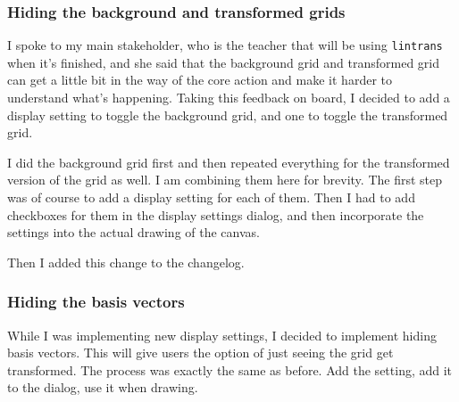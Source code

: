 \documentclass[../development.tex]{subfiles}
\begin{document}
\subsubsection{Hiding the background and transformed grids\label{development:making-v0.2.2:hiding-the-background-and-transformed-grids}}

I spoke to my main stakeholder, who is the teacher that will be using \texttt{lintrans} when it's finished, and she said that the background grid and transformed grid can get a little bit in the way of the core action and make it harder to understand what's happening. Taking this feedback on board, I decided to add a display setting to toggle the background grid, and one to toggle the transformed grid.

I did the background grid first and then repeated everything for the transformed version of the grid as well. I am combining them here for brevity. The first step was of course to add a display setting for each of them. Then I had to add checkboxes for them in the display settings dialog, and then incorporate the settings into the actual drawing of the canvas.





Then I added this change to the changelog.


\subsubsection{Hiding the basis vectors\label{development:making-v0.2.2:hiding-the-basis-vectors}}

While I was implementing new display settings, I decided to implement hiding basis vectors. This will give users the option of just seeing the grid get transformed. The process was exactly the same as before. Add the setting, add it to the dialog, use it when drawing.

\end{document}
